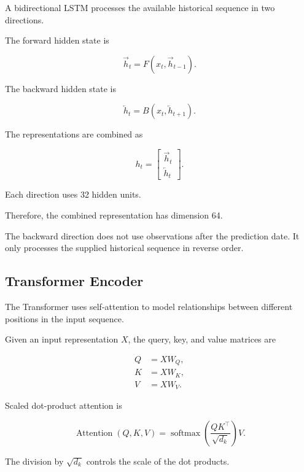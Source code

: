 \documentclass[oneside,english,11pt]{article}
\renewcommand{\boxed}[1]{#1}
\begin{document}
A bidirectional LSTM processes the available
historical sequence in two directions.

The forward hidden state is

\begin{equation}
\overrightarrow{h}_t
=
F(x_t,\overrightarrow{h}_{t-1}).
\end{equation}

The backward hidden state is

\begin{equation}
\overleftarrow{h}_t
=
B(x_t,\overleftarrow{h}_{t+1}).
\end{equation}

The representations are combined as

\begin{equation}
\boxed{
h_t=
\begin{bmatrix}
\overrightarrow{h}_t\\
\overleftarrow{h}_t
\end{bmatrix}.
}
\end{equation}

Each direction uses 32 hidden units.

Therefore, the combined representation
has dimension 64.

The backward direction does not use
observations after the prediction date.
It only processes the supplied historical
sequence in reverse order.

\subsection{Transformer Encoder}

The Transformer uses self-attention to
model relationships between different
positions in the input sequence.

Given an input representation $X$,
the query, key, and value matrices are

\begin{align}
Q&=XW_Q,\\
K&=XW_K,\\
V&=XW_V.
\end{align}

Scaled dot-product attention is

\begin{equation}
\boxed{
\operatorname{Attention}(Q,K,V)
=
\operatorname{softmax}
\left(
\frac{QK^\top}{\sqrt{d_k}}
\right)V.
}
\end{equation}

The division by $\sqrt{d_k}$ controls
the scale of the dot products.
\end{document}
